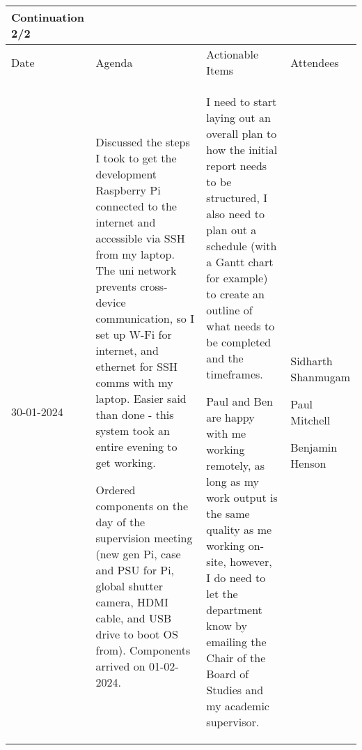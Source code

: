 \begin{table}[!h]
    \centering
    \begin{tabularx}{\textwidth}{|l|X|X|X|}
        \hline
        Continuation 2/2 \\
        \hline
        \hline
        Date & Agenda & Actionable Items & Attendees \\
        \hline
        \hline
        30-01-2024 & 
        \begin{myitemize}
            \item Discussed the steps I took to get the development Raspberry Pi connected to the internet and accessible via SSH from my laptop. The uni network prevents cross-device communication, so I set up W-Fi for internet, and ethernet for SSH comms with my laptop. Easier said than done - this system took an entire evening to get working.
            \item Ordered components on the day of the supervision meeting (new gen Pi, case and PSU for Pi, global shutter camera, HDMI cable, and USB drive to boot OS from). Components arrived on 01-02-2024.
        \end{myitemize} &
        \begin{myitemize}
            \item I need to start laying out an overall plan to how the initial report needs to be structured, I also need to plan out a schedule (with a Gantt chart for example) to create an outline of what needs to be completed and the timeframes.
            \item Paul and Ben are happy with me working remotely, as long as my work output is the same quality as me working on-site, however, I do need to let the department know by emailing the Chair of the Board of Studies and my academic supervisor.
        \end{myitemize} &
        \begin{myitemize}
            \item Sidharth Shanmugam
            \item Paul Mitchell
            \item Benjamin Henson
        \end{myitemize} \\
        \hline
    \end{tabularx}
\end{table}
